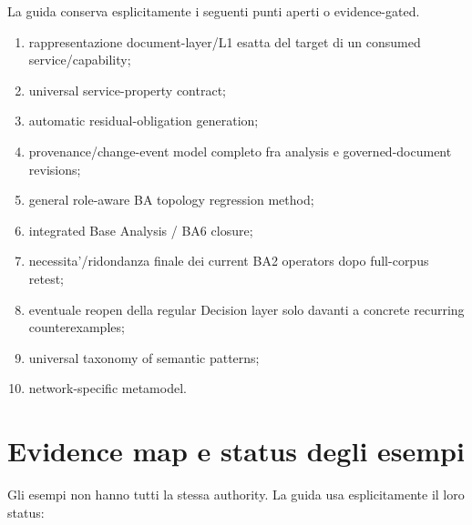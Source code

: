 \documentclass[11pt,a4paper]{article}
\begin{document}
\begin{statusopen}
La guida conserva esplicitamente i seguenti punti aperti o evidence-gated.
\end{statusopen}

\begin{enumerate}
\item rappresentazione document-layer/L1 esatta del target di un consumed service/capability;
\item universal service-property contract;
\item automatic residual-obligation generation;
\item provenance/change-event model completo fra analysis e governed-document revisions;
\item general role-aware BA topology regression method;
\item integrated Base Analysis / BA6 closure;
\item necessita'/ridondanza finale dei current BA2 operators dopo full-corpus retest;
\item eventuale reopen della regular Decision layer solo davanti a concrete recurring counterexamples;
\item universal taxonomy of semantic patterns;
\item network-specific metamodel.
\end{enumerate}

\section{Evidence map e status degli esempi}

Gli esempi non hanno tutti la stessa authority. La guida usa esplicitamente il loro status:
\end{document}
